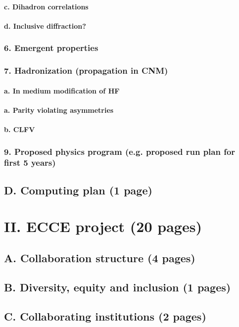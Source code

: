 \documentclass{report}
\begin{document}
\subsubsection{c. Dihadron correlations}
\subsubsection{d. Inclusive diffraction?}
\subsection{6. Emergent properties}
\subsection{7. Hadronization (propagation in CNM)}
\subsubsection{a. In medium modification of HF}
\subsubsection{a. Parity violating asymmetries}
\subsubsection{b. CLFV}
\subsection{9. Proposed physics program (e.g. proposed run plan for first 5 years)}
\section{D. Computing plan (1 page)}
%
\chapter{II. ECCE project (20 pages)}
%
\section{A. Collaboration structure (4 pages)}
\section{B. Diversity, equity and inclusion (1 pages)}
\section{C. Collaborating institutions (2 pages)}
\end{document}
